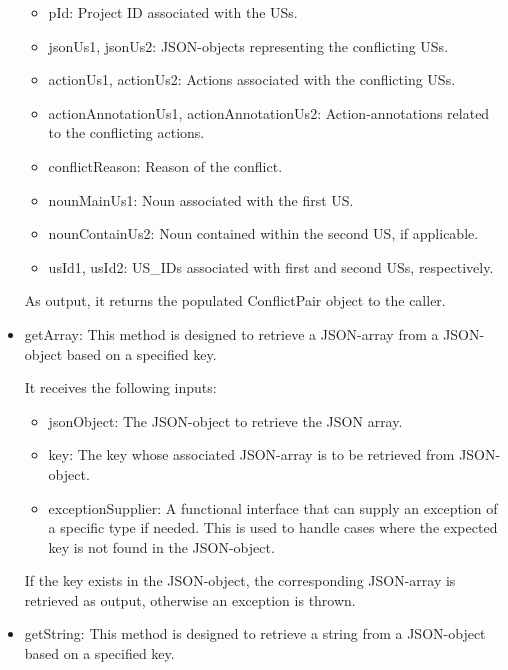 \begin{itemize}
\begin{itemize}
		\item pId: Project ID associated with the USs.
		
		\item jsonUs1, jsonUs2: JSON-objects representing the conflicting USs.
		
		\item actionUs1, actionUs2: Actions associated with the conflicting USs.
		
		\item actionAnnotationUs1, actionAnnotationUs2: Action-annotations related to the conflicting actions.
		
		\item conflictReason: Reason of the conflict.
		
		\item nounMainUs1: Noun associated with the first US.
		
		\item nounContainUs2: Noun contained within the second US, if applicable.
		
		\item usId1, usId2: US\_IDs associated with first and second USs, respectively.
	\end{itemize}
	As output, it returns the populated ConflictPair object to the caller. 
	
	\item getArray: This method is designed to retrieve a JSON-array from a JSON-object based on a specified key.
	
	It receives the following inputs:
	\begin{itemize}
		\item jsonObject: The JSON-object to retrieve the JSON array.
		
		\item key: The key whose associated JSON-array is to be retrieved from JSON-object.
		
		\item exceptionSupplier: A functional interface that can supply an exception of a specific type if needed. This is used to handle cases where the expected key is not found in the JSON-object.
		
	\end{itemize}
	If the key exists in the JSON-object, the corresponding JSON-array is retrieved as output, otherwise an exception is thrown.
	
	\item getString: This method is designed to retrieve a string from a JSON-object based on a specified key.
	

\end{itemize}
